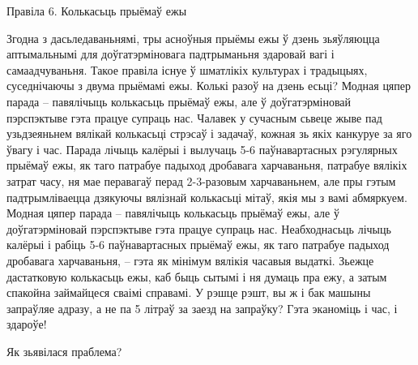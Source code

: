 Правіла 6. Колькасьць прыёмаў ежы

Згодна з дасьледаваньнямі, тры асноўныя прыёмы ежы ў дзень зьяўляюцца аптымальнымі для доўгатэрміновага падтрыманьня здаровай вагі і самаадчуваньня. Такое правіла існуе ў шматлікіх культурах і традыцыях, суседнічаючы з двума прыёмамі ежы.
Колькі разоў на дзень есьці? Модная цяпер парада – павялічыць колькасьць прыёмаў ежы, але ў доўгатэрміновай пэрспэктыве гэта працуе супраць нас. Чалавек у сучасным сьвеце жыве пад узьдзеяньнем вялікай колькасьці стрэсаў і задачаў, кожная зь якіх канкуруе за яго ўвагу і час. Парада лічыць калёрыі і вылучаць 5-6 паўнавартасных рэгулярных прыёмаў ежы, як таго патрабуе падыход дробавага харчаваньня, патрабуе вялікіх затрат часу, ня мае перавагаў перад 2-3-разовым харчаваньнем, але пры гэтым падтрымліваецца дзякуючы вялізнай колькасьці мітаў, якія мы з вамі абмяркуем.
Модная цяпер парада – павялічыць колькасьць прыёмаў ежы, але ў доўгатэрміновай пэрспэктыве гэта працуе супраць нас. Неабходнасьць лічыць калёрыі і рабіць 5-6 паўнавартасных прыёмаў ежы, як таго патрабуе падыход дробавага харчаваньня, – гэта як мінімум вялікія часавыя выдаткі.
Зьежце дастатковую колькасьць ежы, каб быць сытымі і ня думаць пра ежу, а затым спакойна займайцеся сваімі справамі. У рэшце рэшт, вы ж і бак машыны запраўляе адразу, а не па 5 літраў за заезд на запраўку? Гэта эканоміць і час, і здароўе!

Як зьявілася праблема?

